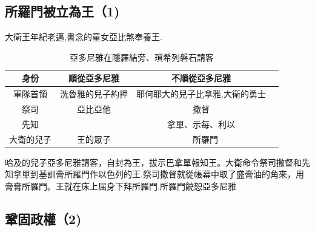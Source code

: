 \documentclass{ctexart}
\begin{document}
\subsection{所羅門被立為王（1)}
大衛王年紀老邁,書念的童女亞比煞奉養王.
\begin{table}[!hbp]
\centering
\begin{tabular}{|c|c|c|c|}
\hline
\hline
 身份 &順從亞多尼雅    &  不順從亞多尼雅\\\hline\hline
 軍隊首領&洗魯雅的兒子約押 &耶何耶大的兒子比拿雅,大衛的勇士 \\\hline
祭司   & 亞比亞他&撒督 \\\hline
先知& & 拿單、示每、利以  \\\hline
大衛的兒子 &王的眾子&　所羅門\\\hline
\end{tabular}
\caption{亞多尼雅在隱羅結旁、瑣希列磐石請客}
\end{table}

哈及的兒子亞多尼雅請客，自封為王，拔示巴拿單報知王。大衛命令祭司撒督和先知拿單到基訓膏所羅門作以色列的王.祭司撒督就從帳幕中取了盛膏油的角來，用膏膏所羅門。王就在床上屈身下拜所羅門.所羅門饒恕亞多尼雅

\subsection{鞏固政權（2)}
\end{document}
